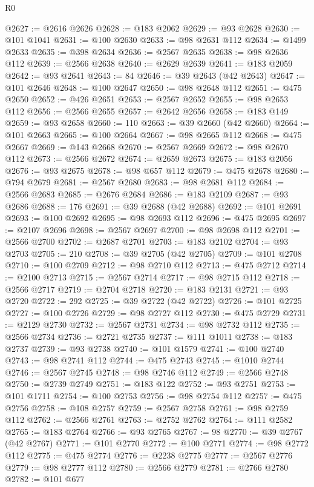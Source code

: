 \begin{lexlean}{R0}
\begin{coremodule}
@2627 := @2616 @2626
@2628 := @183 @2062
@2629 := @93 @2628
@2630 := @101 @1041
@2631 := @100 @2630
@2633 := @98 @2631 @112
@2634 := @1499 @2633
@2635 := @398 @2634
@2636 := @2567 @2635
@2638 := @98 @2636 @112
@2639 := @2566 @2638
@2640 := @2629 @2639
@2641 := @183 @2059
@2642 := @93 @2641
@2643 := 84
@2646 := @39 @2643 (@42 @2643)
@2647 := @101 @2646
@2648 := @100 @2647
@2650 := @98 @2648 @112
@2651 := @475 @2650
@2652 := @426 @2651
@2653 := @2567 @2652
@2655 := @98 @2653 @112
@2656 := @2566 @2655
@2657 := @2642 @2656
@2658 := @183 @149
@2659 := @93 @2658
@2660 := 110
@2663 := @39 @2660 (@42 @2660)
@2664 := @101 @2663
@2665 := @100 @2664
@2667 := @98 @2665 @112
@2668 := @475 @2667
@2669 := @143 @2668
@2670 := @2567 @2669
@2672 := @98 @2670 @112
@2673 := @2566 @2672
@2674 := @2659 @2673
@2675 := @183 @2056
@2676 := @93 @2675
@2678 := @98 @657 @112
@2679 := @475 @2678
@2680 := @794 @2679
@2681 := @2567 @2680
@2683 := @98 @2681 @112
@2684 := @2566 @2683
@2685 := @2676 @2684
@2686 := @183 @2109
@2687 := @93 @2686
@2688 := 176
@2691 := @39 @2688 (@42 @2688)
@2692 := @101 @2691
@2693 := @100 @2692
@2695 := @98 @2693 @112
@2696 := @475 @2695
@2697 := @2107 @2696
@2698 := @2567 @2697
@2700 := @98 @2698 @112
@2701 := @2566 @2700
@2702 := @2687 @2701
@2703 := @183 @2102
@2704 := @93 @2703
@2705 := 210
@2708 := @39 @2705 (@42 @2705)
@2709 := @101 @2708
@2710 := @100 @2709
@2712 := @98 @2710 @112
@2713 := @475 @2712
@2714 := @2100 @2713
@2715 := @2567 @2714
@2717 := @98 @2715 @112
@2718 := @2566 @2717
@2719 := @2704 @2718
@2720 := @183 @2131
@2721 := @93 @2720
@2722 := 292
@2725 := @39 @2722 (@42 @2722)
@2726 := @101 @2725
@2727 := @100 @2726
@2729 := @98 @2727 @112
@2730 := @475 @2729
@2731 := @2129 @2730
@2732 := @2567 @2731
@2734 := @98 @2732 @112
@2735 := @2566 @2734
@2736 := @2721 @2735
@2737 := @111 @1011
@2738 := @183 @2737
@2739 := @93 @2738
@2740 := @101 @1579
@2741 := @100 @2740
@2743 := @98 @2741 @112
@2744 := @475 @2743
@2745 := @1010 @2744
@2746 := @2567 @2745
@2748 := @98 @2746 @112
@2749 := @2566 @2748
@2750 := @2739 @2749
@2751 := @183 @122
@2752 := @93 @2751
@2753 := @101 @1711
@2754 := @100 @2753
@2756 := @98 @2754 @112
@2757 := @475 @2756
@2758 := @108 @2757
@2759 := @2567 @2758
@2761 := @98 @2759 @112
@2762 := @2566 @2761
@2763 := @2752 @2762
@2764 := @111 @2582
@2765 := @183 @2764
@2766 := @93 @2765
@2767 := 98
@2770 := @39 @2767 (@42 @2767)
@2771 := @101 @2770
@2772 := @100 @2771
@2774 := @98 @2772 @112
@2775 := @475 @2774
@2776 := @2238 @2775
@2777 := @2567 @2776
@2779 := @98 @2777 @112
@2780 := @2566 @2779
@2781 := @2766 @2780
@2782 := @101 @677

\end{coremodule}
\end{lexlean}
